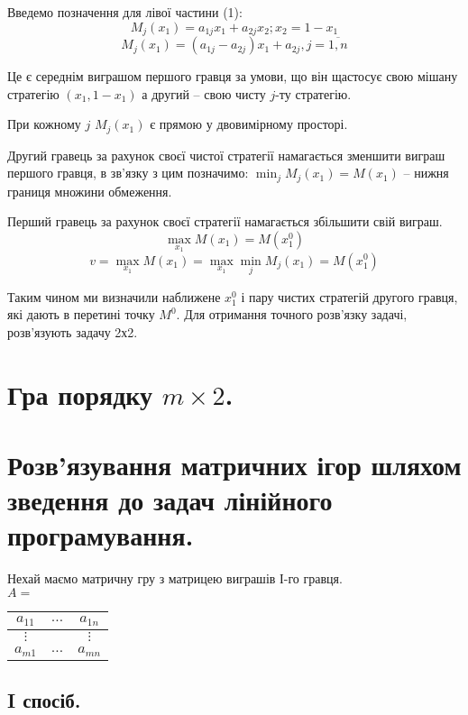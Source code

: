 \documentclass[12pt,a4paper]{report}
\begin{document}
Введемо позначення для лівої частини (1):
\[M_j(x_1) = a_{1j}x_1+a_{2j}x_2; x_2=1-x_1\]
\begin{equation}
M_j(x_1)=(a_{1j}-a_{2j})x_1+a_{2j}, j=\overline{1,n}
\end{equation}

Це є середнім виграшом першого гравця за умови, що він щастосує свою мішану стратегію $(x_1,1-x_1)$ а другий -- свою чисту $j$-ту стратегію.

При кожному $j$ $M_j(x_1)$ є прямою у двовимірному просторі.

Другий гравець за рахунок своєї чистої стратегії намагається зменшити виграш першого гравця, в зв'язку з цим позначимо:
$\displaystyle \min_jM_j(x_1)=M(x_1)$ -- нижня границя множини обмеження.

Перший гравець за рахунок своєї стратегії намагається збільшити свій виграш.
\[\max_{x_1} M(x_1) = M(x_1^0)\]
\[v=\max_{x_1} M(x_1)=\max_{x_1} \min_jM_j(x_1)=M(x_1^0)\]

Таким чином ми визначили наближене $x_1^0$ і пару чистих стратегій другого гравця, які дають в перетині точку $M^0$. Для отримання точного розв'язку задачі, розв'язують задачу 2х2. 

\clearpage

\chapter{Гра порядку $m \times 2$.}

\clearpage

\chapter{Розв'язування матричних ігор шляхом зведення до задач лінійного програмування.}

Нехай маємо матричну гру з матрицею виграшів І-го гравця.\\
$A =$
\begin{tabular}{|c|c|c|}
\hline
$a_{1 1}$&$\dots$&$a_{1 n}$\\
\hline
$\vdots$&&$\vdots$\\
\hline
$a_{m 1}$&$\dots$&$a_{m n}$\\
\hline
\end{tabular}

\section{I спосіб.}
\end{document}
